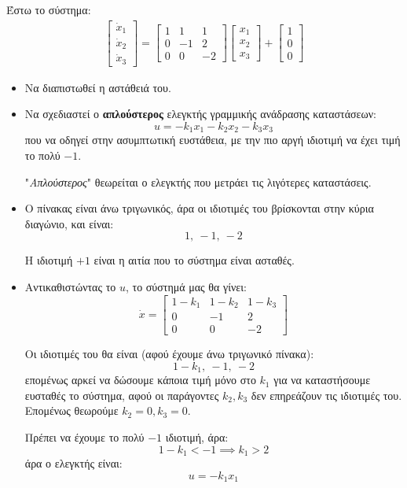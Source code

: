 \documentclass[11pt,a4paper,notitlepage,fleqn]{article}
\begin{document}
\begin{exercise}
	Έστω το σύστημα:
	\begin{align*}
		\left[\begin{matrix}
		\dot x_1 \\ \dot x_2 \\ \dot x_3
		\end{matrix}\right] = \left[\begin{matrix}
		1 & 1 & 1 \\ 0 & -1 & 2 \\
		0 & 0 & -2
		\end{matrix}\right]\left[\begin{matrix}
		x_1 \\ x_2 \\ x_3
		\end{matrix}\right] + \left[\begin{matrix}
		1 \\ 0 \\ 0
		\end{matrix}\right]
	\end{align*}

	\begin{itemize}
		\item Να διαπιστωθεί η αστάθειά του.
		\item Να σχεδιαστεί ο \textbf{απλούστερος} ελεγκτής γραμμικής ανάδρασης καταστάσεων:
		\[
		u = -k_1 x_1 - k_2x_2 -k_3x_3
		\]
	    που να οδηγεί στην ασυμπτωτική ευστάθεια, με την πιο αργή ιδιοτιμή
	    να έχει τιμή το πολύ \( -1 \).

	    "\textit{Απλούστερος}" θεωρείται ο ελεγκτής που μετράει τις λιγότερες
	    καταστάσεις.
	\end{itemize}
    \tcblower
    \begin{itemize}
    	\item Ο πίνακας είναι άνω τριγωνικός, άρα οι ιδιοτιμές του βρίσκονται στην κύρια διαγώνιο, και είναι:
    	\[
    	1,\ -1,\ -2
    	\]

    	Η ιδιοτιμή \( +1 \) είναι η αιτία που το σύστημα είναι ασταθές.
    	\item Αντικαθιστώντας το \( u \), το σύστημά μας θα γίνει:
    	\[
    	\dot x = \left[\begin{matrix}
    	1-k_1 & 1-k_2 & 1-k_3 \\
    	0 & -1 & 2 \\
    	0 & 0 & -2
    	\end{matrix}\right]
    	\]

    	Οι ιδιοτιμές του θα είναι (αφού έχουμε άνω τριγωνικό πίνακα):
    	\[
    	1-k_1, \ -1,\ -2
    	\]
    	επομένως αρκεί να δώσουμε κάποια τιμή μόνο στο \( k_1 \) για να
    	καταστήσουμε ευσταθές το σύστημα, αφού οι παράγοντες \( k_2,k_3 \)
    	δεν επηρεάζουν τις ιδιοτιμές του. Επομένως θεωρούμε \( k_2 = 0, k_3 = 0 \).

    	Πρέπει να έχουμε το πολύ \( -1 \) ιδιοτιμή, άρα:
    	\[
    	1-k_1 < -1 \implies \boxed{k_1 > 2}
    	\]
    	άρα ο ελεγκτής είναι:
    	\[
    	u = -k_1x_1
    	\]
    \end{itemize}
\end{exercise}
\end{document}
